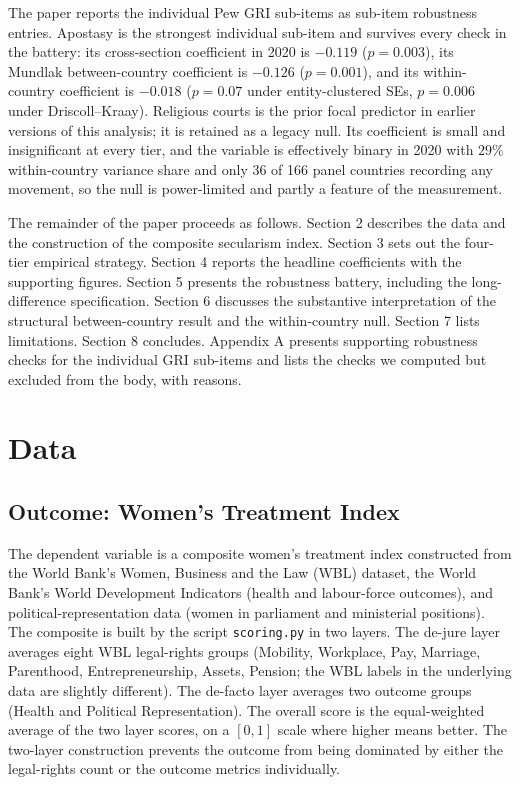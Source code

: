 \documentclass[12pt,a4paper]{article}
\begin{document}
The paper reports the individual Pew GRI sub-items as sub-item robustness entries. Apostasy is the strongest individual sub-item and survives every check in the battery: its cross-section coefficient in 2020 is $-0.119$ ($p = 0.003$), its Mundlak between-country coefficient is $-0.126$ ($p = 0.001$), and its within-country coefficient is $-0.018$ ($p = 0.07$ under entity-clustered SEs, $p = 0.006$ under Driscoll--Kraay). Religious courts is the prior focal predictor in earlier versions of this analysis; it is retained as a legacy null. Its coefficient is small and insignificant at every tier, and the variable is effectively binary in 2020 with $29\%$ within-country variance share and only 36 of 166 panel countries recording any movement, so the null is power-limited and partly a feature of the measurement.

The remainder of the paper proceeds as follows. Section 2 describes the data and the construction of the composite secularism index. Section 3 sets out the four-tier empirical strategy. Section 4 reports the headline coefficients with the supporting figures. Section 5 presents the robustness battery, including the long-difference specification. Section 6 discusses the substantive interpretation of the structural between-country result and the within-country null. Section 7 lists limitations. Section 8 concludes. Appendix A presents supporting robustness checks for the individual GRI sub-items and lists the checks we computed but excluded from the body, with reasons.

\section{Data}

\subsection{Outcome: Women's Treatment Index}

The dependent variable is a composite women's treatment index constructed from the World Bank's Women, Business and the Law (WBL) dataset, the World Bank's World Development Indicators (health and labour-force outcomes), and political-representation data (women in parliament and ministerial positions). The composite is built by the script \texttt{scoring.py} in two layers. The de-jure layer averages eight WBL legal-rights groups (Mobility, Workplace, Pay, Marriage, Parenthood, Entrepreneurship, Assets, Pension; the WBL labels in the underlying data are slightly different). The de-facto layer averages two outcome groups (Health and Political Representation). The overall score is the equal-weighted average of the two layer scores, on a $[0, 1]$ scale where higher means better. The two-layer construction prevents the outcome from being dominated by either the legal-rights count or the outcome metrics individually.
\end{document}
